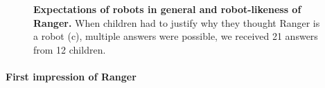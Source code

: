 \documentclass{sig-alternate}
\begin{document}
\begin{figure}[!h]
    \centering
    \caption[Expectations and Robot-likeness or Ranger]{\small
    \textbf{Expectations of robots in general and robot-likeness of Ranger.}
    When children had to justify why they thought Ranger is a robot (c), multiple
    answers were possible, we received 21 answers from 12 children.} 

    \label{fig:domino-expectations}
\end{figure}

\paragraph{First impression of Ranger}
\end{document}

